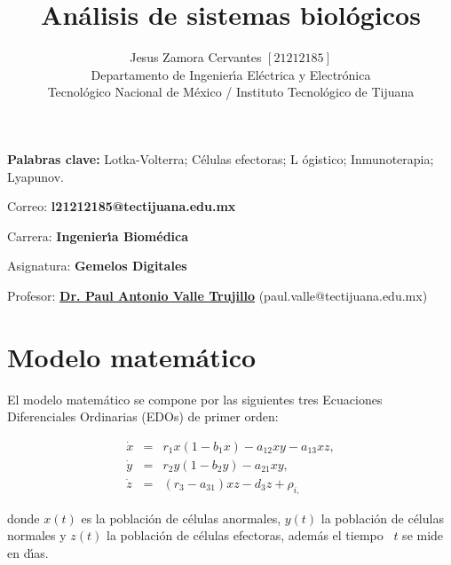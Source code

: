 \documentclass[letterpaper,11pt]{article}
\begin{document}
\title{An\'{a}lisis de sistemas biol\'{o}gicos}
\author{Jesus Zamora Cervantes $\left[ 21212185\right] $ \\
Departamento de Ingenier\'{\i}a El\'{e}ctrica y Electr\'{o}nica\\
Tecnol\'{o}gico Nacional de M\'{e}xico / Instituto Tecnol\'{o}gico de Tijuana%
}
\maketitle

\noindent \textbf{Palabras clave: }Lotka-Volterra; C\'{e}lulas efectoras; L%
\'{o}gistico; Inmunoterapia; Lyapunov.

\noindent

\bigskip

\noindent Correo: \textbf{l21212185@tectijuana.edu.mx}

\noindent \noindent Carrera: \textbf{Ingenier\'{\i}a Biom\'{e}dica }

\noindent Asignatura: \textbf{Gemelos Digitales}

\noindent Profesor: \href{https://biomath.xyz/}{\textbf{Dr. Paul Antonio
Valle Trujillo}} (paul.valle@tectijuana.edu.mx)

\section{Modelo matem\'{a}tico}

El modelo matem\'{a}tico se compone por las siguientes tres Ecuaciones
Diferenciales Ordinarias (EDOs) de primer orden:

\begin{eqnarray*}
\dot{x} &=&r_{1}x(1-b_{1}x)-a_{12}xy-a_{13}xz, \\
\dot{y} &=&r_{2}y(1-b_{2}y)-a_{21}xy, \\
\dot{z} &=&(r_{3}-a_{31})xz-d_{3}z+\rho _{i,}
\end{eqnarray*}

donde $x\left( t\right) $ es la poblaci\'{o}n de c\'{e}lulas anormales, $%
y\left( t\right) $ la poblaci\'{o}n de c\'{e}lulas normales y $z\left(
t\right) $ la poblaci\'{o}n de c\'{e}lulas efectoras, adem\'{a}s el tiempo \ 
$t$ se mide en d\'{\i}as.
\end{document}
